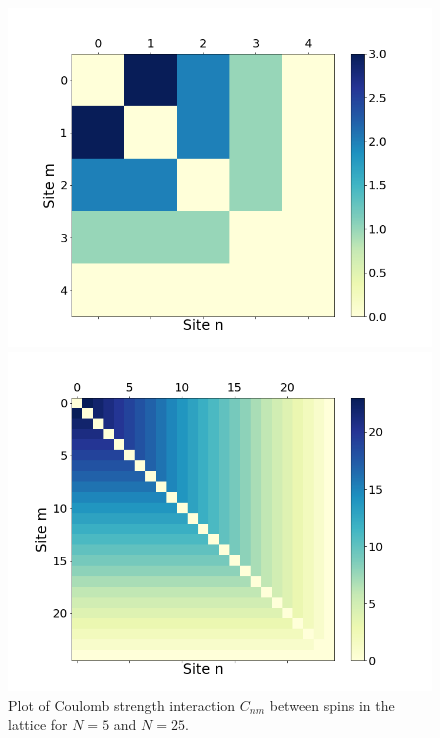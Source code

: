 \begin{figure}[htb]
	\centering
	\begin{minipage}{0.5\textwidth}
		\centering
		\includegraphics[scale=0.27]{figures/c_ij_N=5.png}
	\end{minipage}%
	\begin{minipage}{0.5\textwidth}
		\centering
		\includegraphics[scale=0.27]{figures/c_ij_N=25.png}
	\end{minipage}
	\caption{Plot of Coulomb strength interaction $C_{nm}$ between spins in the lattice for $N=5$ and $N=25$.}
	\label{fig:coul}
\end{figure}

